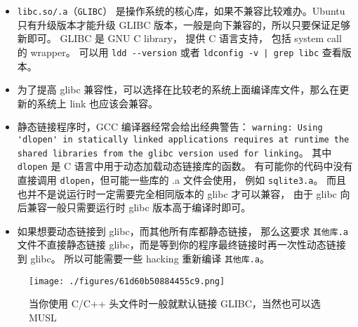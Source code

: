 \begin{itemize}
\item \verb`libc.so/.a`（\verb`GLIBC`） 是操作系统的核心库，如果不兼容比较难办。Ubuntu 只有升级版本才能升级 GLIBC 版本，一般是向下兼容的，所以只要保证足够新即可。 GLIBC 是 GNU C library， 提供 C 语言支持， 包括 system call 的 wrapper。 可以用 \verb`ldd --version` 或者 \verb`ldconfig -v | grep libc` 查看版本。
\item 为了提高 glibc 兼容性，可以选择在比较老的系统上面编译库文件，那么在更新的系统上 link 也应该会兼容。
\item 静态链接程序时，GCC 编译器经常会给出经典警告： \verb`warning: Using 'dlopen' in statically linked applications requires at runtime the shared libraries from the glibc version used for linking`。 其中 \verb`dlopen` 是 C 语言中用于动态加载动态链接库的函数。 有可能你的代码中没有直接调用 \verb`dlopen`，但可能一些库的 .a 文件会使用， 例如 \verb`sqlite3.a`。 而且也并不是说运行时一定需要完全相同版本的 glibc 才可以兼容， 由于 glibc 向后兼容一般只需要运行时 glibc 版本高于编译时即可。
\item 如果想要动态链接到 glibc，而其他所有库都静态链接， 那么这要求 \verb`其他库.a` 文件不直接静态链接 glibc，而是等到你的程序最终链接时再一次性动态链接到 glibc。 所以可能需要一些 hacking 重新编译 \verb`其他库.a`。
\end{itemize}

\begin{figure}[ht]
\centering
\texttt{[image: ./figures/61d60b50884455c9.png]}
\caption{当你使用 C/C++ 头文件时一般就默认链接 GLIBC，当然也可以选 MUSL} \label{fig_LinBin_1}
\end{figure}
